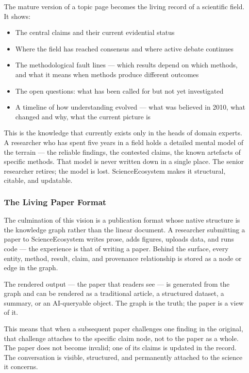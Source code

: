 The mature version of a topic page becomes the living record of a scientific
field. It shows:

\begin{itemize}
  \item The central claims and their current evidential status
  \item Where the field has reached consensus and where active debate continues
  \item The methodological fault lines — which results depend on which methods,
        and what it means when methods produce different outcomes
  \item The open questions: what has been called for but not yet investigated
  \item A timeline of how understanding evolved — what was believed in 2010,
        what changed and why, what the current picture is
\end{itemize}

This is the knowledge that currently exists only in the heads of domain experts.
A researcher who has spent five years in a field holds a detailed mental model
of the terrain — the reliable findings, the contested claims, the known
artefacts of specific methods. That model is never written down in a single
place. The senior researcher retires; the model is lost. ScienceEcosystem makes
it structural, citable, and updatable.

\subsubsection*{The Living Paper Format}

The culmination of this vision is a publication format whose native structure
is the knowledge graph rather than the linear document. A researcher submitting
a paper to ScienceEcosystem writes prose, adds figures, uploads data, and runs
code — the experience is that of writing a paper. Behind the surface, every
entity, method, result, claim, and provenance relationship is stored as a node
or edge in the graph.

The rendered output — the paper that readers see — is generated from the graph
and can be rendered as a traditional article, a structured dataset, a summary,
or an AI-queryable object. The graph is the truth; the paper is a view of it.

This means that when a subsequent paper challenges one finding in the original,
that challenge attaches to the specific claim node, not to the paper as a whole.
The paper does not become invalid; one of its claims is updated in the record.
The conversation is visible, structured, and permanently attached to the science
it concerns.

